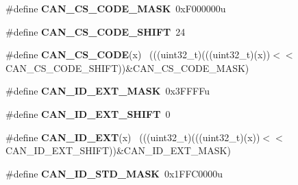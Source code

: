 \begin{DoxyCompactItemize}
\item 
\hypertarget{group___c_a_n___register___masks_gadff04787b30174d22d7955037c850b7c}{}\#define {\bfseries C\+A\+N\+\_\+\+C\+S\+\_\+\+C\+O\+D\+E\+\_\+\+M\+A\+S\+K}~0x\+F000000u\label{group___c_a_n___register___masks_gadff04787b30174d22d7955037c850b7c}

\item 
\hypertarget{group___c_a_n___register___masks_ga58e7e6f814f9a6f5fa03974e3f4d7e34}{}\#define {\bfseries C\+A\+N\+\_\+\+C\+S\+\_\+\+C\+O\+D\+E\+\_\+\+S\+H\+I\+F\+T}~24\label{group___c_a_n___register___masks_ga58e7e6f814f9a6f5fa03974e3f4d7e34}

\item 
\hypertarget{group___c_a_n___register___masks_ga79532eda4eb8b2aae247a9ad6b651039}{}\#define {\bfseries C\+A\+N\+\_\+\+C\+S\+\_\+\+C\+O\+D\+E}(x)                                                  ~(((uint32\+\_\+t)(((uint32\+\_\+t)(x))$<$$<$C\+A\+N\+\_\+\+C\+S\+\_\+\+C\+O\+D\+E\+\_\+\+S\+H\+I\+F\+T))\&C\+A\+N\+\_\+\+C\+S\+\_\+\+C\+O\+D\+E\+\_\+\+M\+A\+S\+K)\label{group___c_a_n___register___masks_ga79532eda4eb8b2aae247a9ad6b651039}

\item 
\hypertarget{group___c_a_n___register___masks_gacd238d5b88bd71a60ff7c00da7427be7}{}\#define {\bfseries C\+A\+N\+\_\+\+I\+D\+\_\+\+E\+X\+T\+\_\+\+M\+A\+S\+K}~0x3\+F\+F\+F\+Fu\label{group___c_a_n___register___masks_gacd238d5b88bd71a60ff7c00da7427be7}

\item 
\hypertarget{group___c_a_n___register___masks_gadd4a0522a5d856f631a2812cc8fe909c}{}\#define {\bfseries C\+A\+N\+\_\+\+I\+D\+\_\+\+E\+X\+T\+\_\+\+S\+H\+I\+F\+T}~0\label{group___c_a_n___register___masks_gadd4a0522a5d856f631a2812cc8fe909c}

\item 
\hypertarget{group___c_a_n___register___masks_gaccea7da4e886b7bb3cf592e5c5b81e67}{}\#define {\bfseries C\+A\+N\+\_\+\+I\+D\+\_\+\+E\+X\+T}(x)                                                    ~(((uint32\+\_\+t)(((uint32\+\_\+t)(x))$<$$<$C\+A\+N\+\_\+\+I\+D\+\_\+\+E\+X\+T\+\_\+\+S\+H\+I\+F\+T))\&C\+A\+N\+\_\+\+I\+D\+\_\+\+E\+X\+T\+\_\+\+M\+A\+S\+K)\label{group___c_a_n___register___masks_gaccea7da4e886b7bb3cf592e5c5b81e67}

\item 
\hypertarget{group___c_a_n___register___masks_ga35a257f1f6dd8ee576becf1f05e995c2}{}\#define {\bfseries C\+A\+N\+\_\+\+I\+D\+\_\+\+S\+T\+D\+\_\+\+M\+A\+S\+K}~0x1\+F\+F\+C0000u\label{group___c_a_n___register___masks_ga35a257f1f6dd8ee576becf1f05e995c2}


\end{DoxyCompactItemize}
